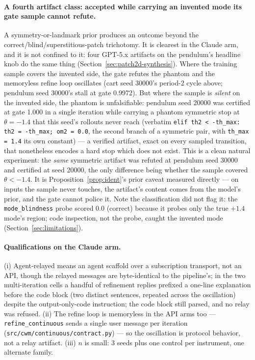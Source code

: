 \documentclass[11pt]{article}
\theoremstyle{definition}
\theoremstyle{remark}
\begin{document}
\paragraph{A fourth artifact class: accepted while carrying an invented mode its gate sample cannot refute.} A symmetry-or-landmark prior produces an outcome beyond the correct/blind/superstitious-patch trichotomy. It is clearest in the Claude arm, and it is not confined to it: four GPT-5.x artifacts on the pendulum's headline knob do the same thing (Section~\ref{sec:patch2d-synthesis}). Where the training sample covers the invented side, the gate refutes the phantom and the memoryless refine loop oscillates (cart seed 30000's period-2 cycle above; pendulum seed 30000's stall at gate 0.9972). But where the sample is \emph{silent} on the invented side, the phantom is unfalsifiable: pendulum seed 20000 was certified at gate 1.000 in a single iteration while carrying a phantom symmetric stop at $\theta = -1.4$ that this seed's rollouts never reach (verbatim \texttt{elif th2 < -th\_max: th2 = -th\_max; om2 = 0.0}, the second branch of a symmetric pair, with \texttt{th\_max = 1.4} its own constant) --- a verified artifact, exact on every sampled transition, that nonetheless encodes a hard stop which does not exist. This is a clean natural experiment: the \emph{same} symmetric artifact was refuted at pendulum seed 30000 and certified at seed 20000, the only difference being whether the sample covered $\theta < -1.4$. It is Proposition~\ref{prop:ident}'s prior caveat measured directly --- on inputs the sample never touches, the artifact's content comes from the model's prior, and the gate cannot police it. Note the classification did not flag it: the \texttt{mode\_blindness} probe scored 0.0 (correct) because it probes only the true $+1.4$ mode's region; code inspection, not the probe, caught the invented mode (Section~\ref{sec:limitations}).

\paragraph{Qualifications on the Claude arm.} (i) Agent-relayed means an agent scaffold over a subscription transport, not an API, though the relayed messages are byte-identical to the pipeline's; in the two multi-iteration cells a handful of refinement replies prefixed a one-line explanation before the code block (two distinct sentences, repeated across the oscillation) despite the output-only-code instruction; the code block still parsed, and no relay was refused. (ii) The refine loop is memoryless in the API arms too --- \texttt{refine\_continuous} sends a single user message per iteration (\texttt{src/cwm/continuous/contract.py}) --- so the oscillation is protocol behavior, not a relay artifact. (iii) $n$ is small: 3 seeds plus one control per instrument, one alternate family.
\end{document}
